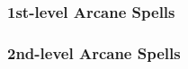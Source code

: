 \subsubsection{1st-level Arcane Spells}
\begin{swspelllist}
    \SLmagearmor[Abjur]
    \SLprotectionfromalignment
    \SLsanctuary
    \SLablativeshield*

    \SLgrease[Conj]
    \SLobscuringmist
    \SLsummonmonsteri
    \SLretrieveobject*

    \SLlocateobjectlesser[Div]
    \SLmessage
    \SLprecognitionlesser*

    \SLcommand
    \SLsanctuary
    \SLsleep
    \SLforget*

    \SLburninghands[Evoc]
    \SLmagehand
    \SLmagicmissile
    \SLshockinggrasp
    \SLfeatherfall*

    \SLcolorspray[Illus]
    \SLdancinglights
    \SLventriloquism
    \SLcreatesound*

    \SLenfeeblement[Necro]
    \SLghoultouch
    \SLinflictlightwounds
    \SLunlivingheart*

    \SLexpeditiousretreat[Trans]
    \SLmagicvestment
    \SLreduceperson*
\end{swspelllist}

\subsubsection{2nd-level Arcane Spells} 
\begin{swspelllist}
    \SLinertialshield[Abjur]
    \SLresistenergy
    \SLsharepain
    \SLablateimpact*

    \SLacidarrow[Conj]
    \SLfogcloud
    \SLglitterdust
    \SLsummonmonsterii
    \SLretrieveally*

    \SLdarkvision[Div]
    \SLlocatecreature
    \SLprecognitionlesser
    \SLseeinvisibility
    \SLforeseeprobability*

    \SLagony[Ench]
    \SLcalmemotions
    \SLholdperson
    \SLtouchofidiocy
    \SLcharmperson*

    \SLscorchingray[Evoc]
    \SLinterposinghand
    \SLsoundburst
    \SLknock*

    \SLblur[Illus]
    \SLmirrorimage
    \SLphantasmalwound
    \SLsilentimage*

    \SLblindnessdeafness[Necro]
    \SLinflictmoderatewounds
    \SLsharepain
    \SLdeathknell*

    \SLmagicweapon[Trans]
    \SLspiderclimb
    \SLtotemicmind
    \SLtotemicpower
    \SLslow
    \SLenlargeperson*
\end{swspelllist}

